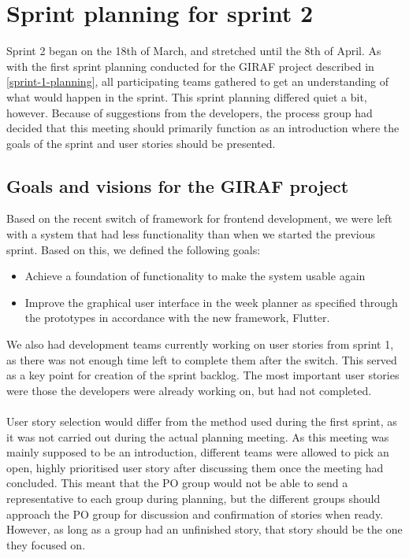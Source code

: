 \section{Sprint planning for sprint 2}
Sprint 2 began on the 18th of March, and stretched until the 8th of April.
As with the first sprint planning conducted for the GIRAF project described in \autoref{sprint-1-planning}, all participating teams gathered to get an understanding of what would happen in the sprint.
This sprint planning differed quiet a bit, however.
Because of suggestions from the developers, the process group had decided that this meeting should primarily function as an introduction where the goals of the sprint and user stories should be presented.

\subsection{Goals and visions for the GIRAF project}
Based on the recent switch of framework for frontend development, we were left with a system that had less functionality than when we started the previous sprint.
Based on this, we defined the following goals:
\begin{itemize}
    \item Achieve a foundation of functionality to make the system usable again
    \item Improve the graphical user interface in the week planner as specified through the prototypes in accordance with the new framework, Flutter.
\end{itemize}
We also had development teams currently working on user stories from sprint 1, as there was not enough time left to complete them after the switch.
This served as a key point for creation of the sprint backlog.
The most important user stories were those the developers were already working on, but had not completed. 
\\\\
User story selection would differ from the method used during the first sprint, as it was not carried out during the actual planning meeting.
As this meeting was mainly supposed to be an introduction, different teams were allowed to pick an open, highly prioritised user story after discussing them once the meeting had concluded.
This meant that the PO group would not be able to send a representative to each group during planning, but the different groups should approach the PO group for discussion and confirmation of stories when ready.
However, as long as a group had an unfinished story, that story should be the one they focused on.
